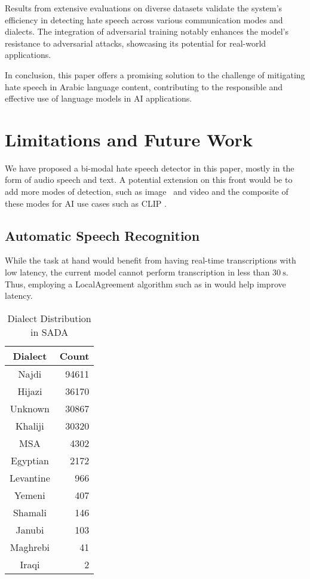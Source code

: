 \documentclass[10pt,twocolumn,letterpaper]{article}
\begin{document}
Results from extensive evaluations on diverse datasets validate the system's efficiency in detecting hate speech across various communication modes and dialects. The integration of adversarial training notably enhances the model's resistance to adversarial attacks, showcasing its potential for real-world applications.

In conclusion, this paper offers a promising solution to the challenge of mitigating hate speech in Arabic language content, contributing to the responsible and effective use of language models in AI applications.

\section{Limitations and Future Work}

We have proposed a bi-modal hate speech detector in this paper, mostly in the form of audio speech and text.
A potential extension on this front would be to add more modes of detection, such as image~\cite{heeDecodingUnderlyingMeaning2023} and video and the composite of these modes for AI use cases such as CLIP \cite{quUnsafeDiffusionGeneration2023}.

\subsection{Automatic Speech Recognition}

While the task at hand would benefit from having real-time transcriptions with low latency,
the current model cannot perform transcription in less than $\qty{30}{\second}$. Thus, employing a LocalAgreement algorithm such as in \cite{machacekTurningWhisperRealTime2023} would help improve latency.

\begin{wraptable}{r}{0pt}
    \begin{tabular}{cr}
        \toprule
        Dialect & Count \\
        \midrule
        Najdi & 94611 \\
        Hijazi & 36170 \\
        Unknown & 30867 \\
        Khaliji & 30320 \\
        MSA & 4302 \\
        Egyptian & 2172 \\
        Levantine & 966 \\
        Yemeni & 407 \\
        Shamali & 146 \\
        Janubi & 103 \\
        Maghrebi & 41 \\
        Iraqi & 2 \\
        \bottomrule
    \end{tabular}
    \caption{Dialect Distribution in SADA}
    \label{tab:dialect-dist}
\end{wraptable}
\end{document}
